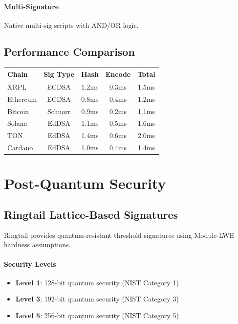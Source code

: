 \documentclass[11pt,twocolumn]{article}
\begin{document}
\paragraph{Multi-Signature} Native multi-sig scripts with AND/OR logic.

\subsection{Performance Comparison}

\begin{table}[h]
\centering
\small
\begin{tabular}{@{}lcccc@{}}
\toprule
\textbf{Chain} & \textbf{Sig Type} & \textbf{Hash} & \textbf{Encode} & \textbf{Total} \\
\midrule
XRPL & ECDSA & 1.2ms & 0.3ms & 1.5ms \\
Ethereum & ECDSA & 0.8ms & 0.4ms & 1.2ms \\
Bitcoin & Schnorr & 0.9ms & 0.2ms & 1.1ms \\
Solana & EdDSA & 1.1ms & 0.5ms & 1.6ms \\
TON & EdDSA & 1.4ms & 0.6ms & 2.0ms \\
Cardano & EdDSA & 1.0ms & 0.4ms & 1.4ms \\
\bottomrule
\end{tabular}

\label{tab:adapter_performance}
\end{table}

\section{Post-Quantum Security}

\subsection{Ringtail Lattice-Based Signatures}

Ringtail provides quantum-resistant threshold signatures using Module-LWE hardness assumptions.

\paragraph{Security Levels}
\begin{itemize}
\item \textbf{Level 1}: 128-bit quantum security (NIST Category 1)
\item \textbf{Level 3}: 192-bit quantum security (NIST Category 3)
\item \textbf{Level 5}: 256-bit quantum security (NIST Category 5)
\end{itemize}
\end{document}
